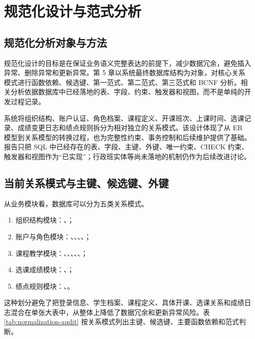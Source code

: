 \chapter{规范化设计与范式分析}

\section{规范化分析对象与方法}

规范化设计的目标是在保证业务语义完整表达的前提下，减少数据冗余，避免插入异常、删除异常和更新异常。第 5 章以系统最终数据库结构为对象，对核心关系模式进行函数依赖、候选键、第一范式、第二范式、第三范式和 BCNF 分析。相关分析依据数据库中已经落地的表、字段、约束、触发器和视图，而不是单纯的开发过程记录。

系统将组织结构、账户认证、角色档案、课程定义、开课班次、上课时间、选课记录、成绩变更日志和绩点规则拆分为相对独立的关系模式。该设计体现了从 ER 模型到关系模型的转换过程，也为完整性约束、事务控制和后续维护提供了基础。报告只把 SQL 中已经存在的表、字段、主键、外键、唯一约束、CHECK 约束、触发器和视图作为“已实现”；行政班实体等尚未落地的机制仍作为后续改进讨论。

\section{当前关系模式与主键、候选键、外键}

从业务模块看，数据库可以分为五类关系模式。

\begin{enumerate}[label=（\arabic*）]
    \item 组织结构模块：、；
    \item 账户与角色模块：、、、、；
    \item 课程教学模块：、、、、、；
    \item 选课成绩模块：、；
    \item 绩点规则模块：、。
\end{enumerate}

这种划分避免了把登录信息、学生档案、课程定义、具体开课、选课关系和成绩日志混合在单张大表中，从整体上降低了数据冗余和更新异常风险。表 \ref{tab:normalization-audit} 按关系模式列出主键、候选键、主要函数依赖和范式判断。


